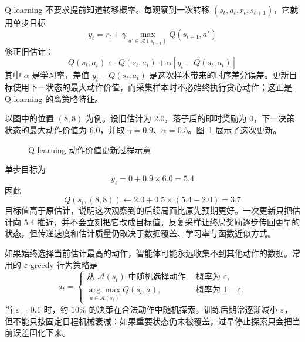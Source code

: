 Q-learning 不要求提前知道转移概率。每观察到一次转移 $(s_t,a_t,r_t,s_{t+1})$，它就用单步目标
\begin{equation}
y_t=r_t+\gamma\max_{a'\in\mathcal A(s_{t+1})}Q(s_{t+1},a')
\end{equation}
修正旧估计：
\begin{equation}
Q(s_t,a_t)
\leftarrow
Q(s_t,a_t)
+\alpha\left[y_t-Q(s_t,a_t)\right]
\end{equation}
其中 $\alpha$ 是学习率，差值 $y_t-Q(s_t,a_t)$ 是这次样本带来的时序差分误差。更新目标使用下一状态的最大动作价值，而采集样本时不必始终执行贪心动作；这正是 Q-learning 的离策略特征。

以图中的位置 $(8,8)$ 为例。设旧估计为 $2.0$，落子后的即时奖励为 $0$，下一决策状态的最大动作价值为 $6.0$，并取 $\gamma=0.9$、$\alpha=0.5$。图~\ref{fig:q_learning_update} 展示了这次更新。

\begin{figure}[htbp]
  \centering
  \caption{Q-learning 动作价值更新过程示意}
  \label{fig:q_learning_update}
\end{figure}

单步目标为
\begin{equation}
y_t=0+0.9\times6.0=5.4
\end{equation}
因此
\begin{equation}
Q(s_t,(8,8))
\leftarrow
2.0+0.5\times(5.4-2.0)
=3.7
\end{equation}
目标值高于原估计，说明这次观察到的后续局面比原先预期更好。一次更新只把估计向 $5.4$ 推近，并不会立刻把它改成目标值。反复采样让终局奖励逐步传回更早的状态，但传递速度和估计质量仍取决于数据覆盖、学习率与函数近似方式。

如果始终选择当前估计最高的动作，智能体可能永远收集不到其他动作的数据。常用的 $\varepsilon$-greedy 行为策略是
\begin{equation}
a_t
=
\begin{cases}
\text{从 $\mathcal{A}(s_t)$ 中随机选择动作}, & \text{概率为 }\varepsilon,\\
\displaystyle
\underset{a\in\mathcal{A}(s_t)}{\arg\max}Q(s_t,a),
& \text{概率为 }1-\varepsilon.
\end{cases}
\end{equation}
当 $\varepsilon=0.1$ 时，约 $10\%$ 的决策在合法动作中随机探索。训练后期常逐渐减小 $\varepsilon$，但不能只按固定日程机械衰减：如果重要状态仍未被覆盖，过早停止探索只会把当前误差固化下来。

